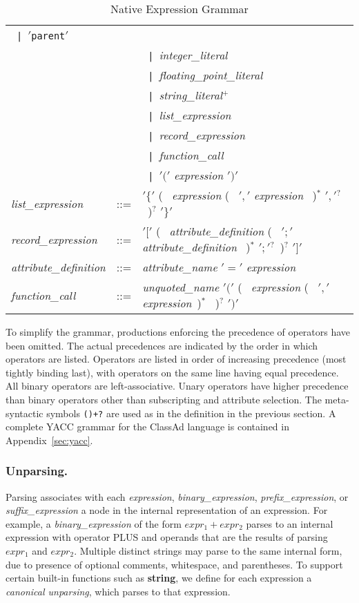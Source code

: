 \documentclass{article}
\newcommand{\qc}[1]{$' \mathtt{#1} '$}
\newcommand{\apos}{$'$}
\newcommand{\alt}{~\texttt{|}~}
\begin{document}
\begin{table}[htb!]
\begin{center}
\begin{tabular}{lcl}
          \alt \apos\verb/parent/\apos \\
    && \alt \emph{integer\_literal} \\
    && \alt \emph{floating\_point\_literal} \\
    && \alt \emph{string\_literal}$^+$ \\
    && \alt \emph{list\_expression} \\
    && \alt \emph{record\_expression} \\
    && \alt \emph{function\_call} \\
    && \alt \qc{(} \emph{expression} \qc{)} \\
\emph{list\_expression} & ::= &
    \qc{\{}
        (~ \emph{expression}  (~ \qc{,} \emph{expression} ~)$^*$
                                \qc{,}$^?$ ~)$^?$
        \qc{\}} \\
\emph{record\_expression} & ::= &
    \qc{[}
         (~ \emph{attribute\_definition}
                (~ \qc{;} \emph{attribute\_definition} ~)$^*$
                \qc{;}$^?$~)$^?$
    \qc{]} \\
\emph{attribute\_definition} & ::= &
    \emph{attribute\_name} \qc{=} \emph{expression} \\
\emph{function\_call} & ::= &
    \emph{unquoted\_name} \qc{(}  (~ \emph{expression}
        (~ \qc{,} \emph{expression}~)$^*$ ~)$^?$ \qc{)}
\end{tabular}
\caption{Native Expression Grammar}
\label{tab:grammar}
\end{center}
\end{table}

To simplify the grammar, productions enforcing the precedence of operators
have been omitted.
The actual precedences are indicated by the order in which operators are
listed.
Operators are listed in order of increasing precedence (most tightly binding
last), with operators on the
same line having equal precedence.
All binary operators are left-associative.
Unary operators have higher precedence than binary operators other than
subscripting and attribute selection.
The meta-syntactic symbols \verb|()+?| are used as in the definition in the
previous section.
A complete YACC grammar for the ClassAd language is contained in
Appendix~\ref{sec:yacc}.

\subsubsection{Unparsing.}
\label{sec:unparsing}
Parsing associates with each \emph{expression}, \emph{binary\_expression},
\emph{prefix\_expression}, or \emph{suffix\_expression} a node in the
internal representation of an expression.  For example, a
\emph{binary\_expression} of the form $expr_1 + expr_2$ parses to an internal
expression with operator PLUS and operands that are the results of parsing
$expr_1$ and $expr_2$.
Multiple distinct strings may parse to the same internal form, due to presence
of optional comments, whitespace, and parentheses.  To support
certain built-in functions such as \textbf{string}, we define for each
expression a \emph{canonical unparsing}, which parses to that expression.
\end{document}
